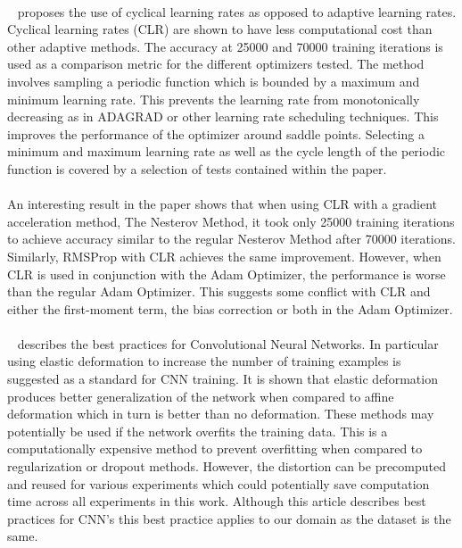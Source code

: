 \documentclass{article}
\begin{document}
\paragraph{}~\citet{smith2017cyclical} proposes  the use of cyclical learning rates as opposed to adaptive learning rates. Cyclical learning rates (CLR) are shown to have less computational cost than other adaptive methods.  The accuracy at 25000 and 70000 training iterations is used as a comparison metric for the different optimizers tested.
The method involves sampling a periodic function which is bounded by a maximum and minimum learning rate. This prevents the learning rate from monotonically decreasing as in ADAGRAD or other learning rate scheduling techniques. This improves the performance of the optimizer around saddle points. Selecting a minimum and maximum learning rate as well as the cycle length of the periodic function is covered by a selection of tests contained within the paper. 

\paragraph{}An interesting result in the paper shows that when using CLR with a gradient acceleration method, The Nesterov Method, it took only 25000 training iterations to achieve accuracy similar to the regular Nesterov Method after 70000 iterations. Similarly, RMSProp with CLR achieves the same improvement. However, when CLR is used in conjunction with the Adam Optimizer, the performance is worse than the regular Adam Optimizer. This suggests some conflict with CLR and either the first-moment term, the bias correction or both in the Adam Optimizer.

 \paragraph{}~\citet{Simard2003BestPF} describes the best practices for Convolutional Neural Networks. In particular using elastic deformation to increase the number of training examples is suggested as a standard for CNN training. It is shown that elastic deformation produces better generalization of the network when compared to affine deformation which in turn is better than no deformation. These methods may potentially be used if the network overfits the training data. This is a computationally expensive method to prevent overfitting when compared to regularization or dropout methods. However, the distortion can be precomputed and reused for various experiments which could potentially save computation time across all experiments in this work. Although this article describes best practices for CNN's this best practice applies to our domain as the dataset is the same.
 
\end{document}
